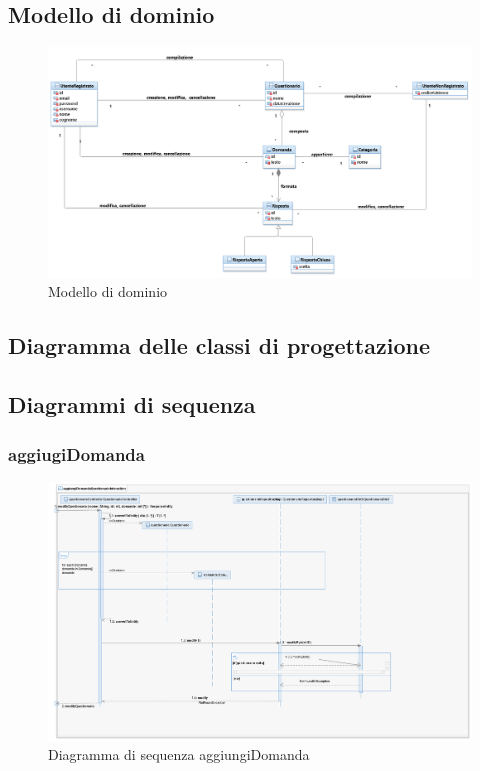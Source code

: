 \documentclass[12pt]{article}
\begin{document}
\subsection{Modello di dominio}
\begin{figure}[H]
\centering
\includegraphics[scale=0.5]{UNIMIBModule_UniMiBModuleDomainLayer.png}
\caption{Modello di dominio}
\end{figure}
\subsection{Diagramma delle classi di progettazione}
\subsection{Diagrammi di sequenza}
\subsubsection{aggiugiDomanda}
\begin{figure}[H]
\centering
\includegraphics[scale=0.40]{UNIMIBModule_aggiungiDomandaQuestionarioSequenceDiagram.png}
\caption{Diagramma di sequenza aggiungiDomanda}
\end{figure}
\end{document}
